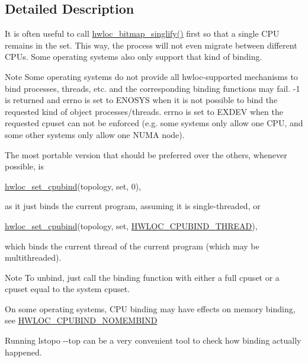 \subsection{Detailed Description}
It is often useful to call \hyperlink{a00065_ga4630aa1b7e08eac5b41be126194e84a1}{hwloc\_\-bitmap\_\-singlify()} first so that a single CPU remains in the set. This way, the process will not even migrate between different CPUs. Some operating systems also only support that kind of binding.

\begin{DoxyNote}{Note}
Some operating systems do not provide all hwloc-\/supported mechanisms to bind processes, threads, etc. and the corresponding binding functions may fail. -\/1 is returned and errno is set to ENOSYS when it is not possible to bind the requested kind of object processes/threads. errno is set to EXDEV when the requested cpuset can not be enforced (e.g. some systems only allow one CPU, and some other systems only allow one NUMA node).
\end{DoxyNote}
The most portable version that should be preferred over the others, whenever possible, is


\begin{DoxyCode}
 \hyperlink{a00049_gaf4cc194d5c0d38004a21b9f03522a7e3}{hwloc_set_cpubind}(topology, \textcolor{keyword}{set}, 0),
\end{DoxyCode}


as it just binds the current program, assuming it is single-\/threaded, or


\begin{DoxyCode}
 \hyperlink{a00049_gaf4cc194d5c0d38004a21b9f03522a7e3}{hwloc_set_cpubind}(topology, \textcolor{keyword}{set}, \hyperlink{a00049_gga217dc8d373f8958cc93c154ebce1c71caf1b6bbad00d7b1017b918e3719f4d421}{HWLOC_CPUBIND_THREAD}),
\end{DoxyCode}


which binds the current thread of the current program (which may be multithreaded).

\begin{DoxyNote}{Note}
To unbind, just call the binding function with either a full cpuset or a cpuset equal to the system cpuset.

On some operating systems, CPU binding may have effects on memory binding, see \hyperlink{a00049_gga217dc8d373f8958cc93c154ebce1c71ca41ce440443cc3087caed95ab60edcad6}{HWLOC\_\-CPUBIND\_\-NOMEMBIND}
\end{DoxyNote}
Running lstopo -\/-\/top can be a very convenient tool to check how binding actually happened. 

